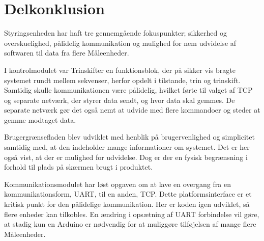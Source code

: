 
\section{Delkonklusion}

Styringsenheden har haft tre gennemgående fokuspunkter; sikkerhed og overskuelighed, pålidelig kommunikation og mulighed for nem udvidelse af softwaren til data fra flere Måleenheder.


I kontrolmodulet var Trinskifter en funktionsblok, der på sikker vis bragte systemet rundt mellem sekvenser, herfor opdelt i tilstande, trin og trinskift. Samtidig skulle kommunikationen være pålidelig, hvilket førte til valget af TCP og separate netværk, der styrer data sendt, og hvor data skal gemmes. De separate netværk gør det også nemt at udvide med flere kommandoer og steder at gemme modtaget data.


Brugergrænsefladen blev udviklet med henblik på brugervenlighed og simplicitet samtidig med, at den indeholder mange informationer om systemet. Det er her også vist, at der er mulighed for udvidelse. Dog er der en fysisk begrænsning i forhold til plads på skærmen brugt i produktet.


Kommunikationsmodulet har løst opgaven om at lave en overgang fra en kommunikationsform, UART, til en anden, TCP. Dette platformsinterface er et kritisk punkt for den pålidelige kommunikation. Her er koden igen udviklet, så flere enheder kan tilkobles. En ændring i opsætning af UART forbindelse vil gøre, at stadig kun en Arduino er nødvendig for at muliggøre tilføjelsen af mange flere Måleenheder.
